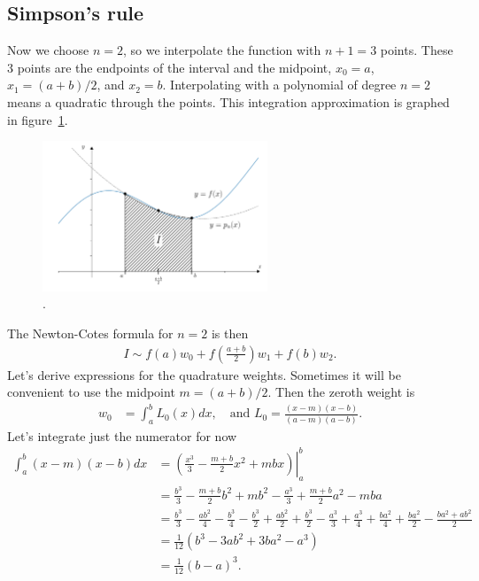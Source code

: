 \subsection{Simpson's rule}
Now we choose $n=2$, so we interpolate the function with $n+1=3$ points. These 3 points are the endpoints of the interval and the midpoint, $x_0=a$, $x_1=(a+b)/2$, and $x_2=b$. Interpolating with a polynomial of degree $n=2$ means a quadratic through the points. This integration approximation is graphed in figure~\ref{fig:ch5_simpsons}.
\begin{figure}[H]
	\begin{center}
	\includegraphics[width=0.6\textwidth]{figures/ch5_simpsons.pdf} 
	  \caption{.} \label{fig:ch5_simpsons}
	\end{center}
\end{figure}
The Newton-Cotes formula for $n=2$ is then
\begin{align*}
I \sim f(a) w_0 + f(\frac{a+b}{2}) w_1 + f(b) w_2.
\end{align*}
Let's derive expressions for the quadrature weights. Sometimes it will be convenient to use the midpoint $m=(a+b)/2$. Then the zeroth weight is
\begin{align*}
w_0 &= \int_a^b L_0(x) dx, \quad \text{and } L_0 = \frac{(x-m)(x-b)}{(a-m)(a-b)}.
\end{align*}
Let's integrate just the numerator for now
\begin{align*}
\int_a^b (x-m)(x-b) dx &= \left.\left( \frac{x^3}{3} - \frac{m+b}{2}x^2 + mbx \right) \right|_a^b \\
&=  \frac{b^3}{3} - \frac{m+b}{2}b^2 + mb^2  -  \frac{a^3}{3} + \frac{m+b}{2}a^2 - mba  \\
&=  \frac{b^3}{3} - \frac{ab^2}{4}  - \frac{b^3}{4} - \frac{b^3}{2} +  \frac{ab^2}{2} +  \frac{b^3}{2} -  \frac{a^3}{3} + \frac{a^3}{4} + \frac{ba^2}{4} + \frac{ba^2}{2} -  \frac{ba^2+ab^2}{2} \\
&= \frac{1}{12}\left(b^3 - 3ab^2 + 3ba^2 - a^3\right) \\
&= \frac{1}{12}\left(b - a\right)^3.
\end{align*}
